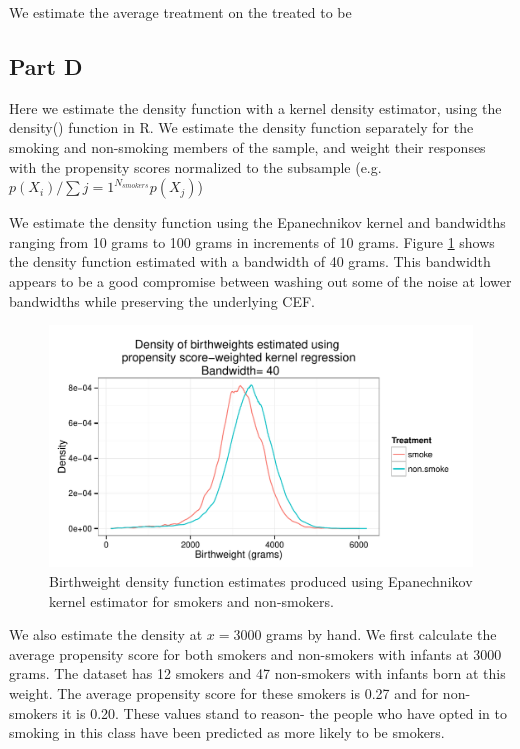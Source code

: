 \documentclass[letterpaper, 12pt]{article}
\begin{document}
We estimate the average treatment on the treated to be 

\subsection{Part D}
Here we estimate the density function with a kernel density estimator, using the density() function in R. We estimate the density function separately for the smoking and non-smoking members of the sample, and weight their responses with the propensity scores normalized to the subsample (e.g. $p(X_i)/\sum\limits{j=1}^{N_{smokers}}p(X_j)$)

We estimate the density function using the Epanechnikov kernel and bandwidths ranging from 10 grams to 100 grams in increments of 10 grams. Figure \ref{fig:kernel40} shows the density function estimated with a bandwidth of 40 grams. This bandwidth appears to be a good compromise between washing out some of the noise at lower bandwidths while preserving the underlying CEF. 

\begin{figure}[h!]
   \centering
   \includegraphics[width=6in]{img/kerndensity40.pdf} 
   \caption{Birthweight density function estimates produced using Epanechnikov kernel estimator for smokers and non-smokers.}
   \label{fig:kernel40}
\end{figure}

We also estimate the density at $x=3000$ grams by hand. We first calculate the average propensity score for both smokers and non-smokers with infants at 3000 grams. The dataset has 12 smokers and 47 non-smokers with infants born at this weight. The average propensity score for these smokers is 0.27 and for non-smokers it is 0.20. These values stand to reason- the people who have opted in to smoking in this class have been predicted as more likely to be smokers.
\end{document}
